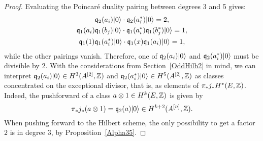 \begin{proposition}
\begin{proof}
Evaluating the Poincar\'e duality pairing between degrees 3 and 5 gives:
\begin{gather*}
 \mathfrak{q}_2(a_i)|0\rangle \cdot \mathfrak{q}_2(a^*_i)|0\rangle = 2, \\
 \mathfrak{q}_1(a_i)\mathfrak{q}_1(b_j)|0\rangle \cdot  \mathfrak{q}_1(a^*_i)\mathfrak{q}_1(b^*_j)|0\rangle = 1, \\
 \mathfrak{q}_1(1)\mathfrak{q}_1(a^*_i)|0\rangle \cdot \mathfrak{q}_1(x)\mathfrak{q}_1(a_i)|0\rangle = 1,
\end{gather*}
while the other pairings vanish. Therefore, one of $\mathfrak{q}_2(a_i)|0\rangle$ and $\mathfrak{q}_2(a^*_i)|0\rangle$ must be divisible by $2$. 
With the considerations from Section~\ref{OddHilb2} in mind, we can interpret $\mathfrak{q}_2(a_i)|0\rangle\in H^3(A^{[2]},\mathbb{Z})$ and $\mathfrak{q}_2(a^*_i)|0\rangle\in H^5(A^{[2]},\mathbb{Z})$ as classes concentrated on the exceptional divisor, that is, as elements of $\pi_* j_*H^*(E,\mathbb{Z})$. Indeed,
the pushforward of a class $a\otimes 1 \in H^{k}(E,\mathbb{Z})$ is given by 
$$
\pi_* j_*(a\otimes 1) = \mathfrak{q}_2(a)|0\rangle \in H^{k+2}(A^{[n]},\mathbb{Z}).
$$
When pushing forward to the Hilbert scheme, the only possibility to get a factor $2$ is in degree $3$, by Proposition~\ref{Alpha35}. 
\end{proof}

\end{proposition}
